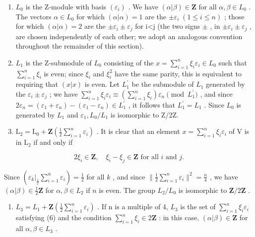 \begin{enumerate}
\def\labelenumi{\arabic{enumi})}
\item
  \(L_{0}\) is the Z-module with basis \((\varepsilon_{i})\) . We have \((\alpha|\beta)\in\mathbf{Z}\) for all \(\alpha,\beta\in L_{0}\) . The vectors \(\alpha\in L_{0}\) for which \((\alpha|\alpha)=1\) are the \(\pm\varepsilon_{i}\;(1\leqslant i\leqslant n)\) ; those for which \((\alpha|\alpha)=2\) are the \(\pm\varepsilon_{i}\pm\varepsilon_{j}\) for i\textless j (the two signs \(\pm\) , in \(\pm\varepsilon_{i}\pm\varepsilon_{j}\) , are chosen independently of each other; we adopt an analogous convention throughout the remainder of this section).
\item
  \(L_{1}\) is the Z-submodule of \(L_{0}\) consisting of the \(x = \sum_{i=1}^{n} \xi_{i} \varepsilon_{i} \in L_{0}\) such that \(\sum_{i=1}^{n} \xi_{i}\) is even; since \(\xi_{i}\) and \(\xi_{i}^{2}\) have the same parity, this is equivalent to requiring that \((x|x)\) is even. Let \(L_{1}^{\prime}\) be the submodule of \(L_{1}\) generated by the \(\varepsilon_{i} \pm \varepsilon_{j}\) ; we have \(\sum_{i=1}^{n} \xi_{i} \varepsilon_{i} \equiv (\sum_{i=1}^{n} \xi_{i}) \varepsilon_{n} \pmod{L_{1}^{\prime}}\) , and since \(2\varepsilon_{n} = (\varepsilon_{1} + \varepsilon_{n}) - (\varepsilon_{1} - \varepsilon_{n}) \in L_{1}^{\prime}\) , it follows that \(L_{1}^{\prime} = L_{1}\) . Since \(L_{0}\) is generated by \(L_{1}\) and \(\varepsilon_{1}, L_{0}/L_{1}\) is isomorphic to Z/2Z.
\item
  \(\mathrm{L}_2 = \mathrm{L}_0 + \mathbf{Z}\left(\frac{1}{2} \sum_{i=1}^{n} \varepsilon_i\right)\) . It is clear that an element \(x = \sum_{i=1}^{n} \xi_i \varepsilon_i\) of \(\mathrm{V}\) is in \(\mathrm{L}_2\) if and only if
\end{enumerate}

\[
2 \xi_ {i} \in \mathbf {Z}, \quad \xi_ {i} - \xi_ {j} \in \mathbf {Z} \text {   for   all   } i \text {   and   } j.\tag{6}
\]

Since \((\varepsilon_k|_{\frac{1}{2}}\sum_{i=1}^{n}\varepsilon_i) = \frac{1}{2}\) for all \(k\) , and since \(\| \frac{1}{2}\sum_{i=1}^{n}\varepsilon_i\|^2 = \frac{n}{4}\) , we have \((\alpha|\beta) \in \frac{1}{2}\mathbf{Z}\) for \(\alpha, \beta \in L_2\) if \(n\) is even. The group \(L_2 / L_0\) is isomorphic to \(\mathbf{Z}/2\mathbf{Z}\) .

\begin{enumerate}
\def\labelenumi{\arabic{enumi})}
\setcounter{enumi}{3}
\tightlist
\item
  \(L_{3} = L_{1} + \mathbf{Z}\left(\frac{1}{2} \sum_{i=1}^{n} \varepsilon_{i}\right)\) . If n is a multiple of 4, \(L_{3}\) is the set of \(\sum_{i=1}^{n} \xi_{i} \varepsilon_{i}\) satisfying (6) and the condition \(\sum_{i=1}^{n} \xi_{i} \in 2\mathbf{Z}\) : in this case, \((\alpha | \beta) \in \mathbf{Z}\) for all \(\alpha, \beta \in L_{3}\) .
\end{enumerate}

